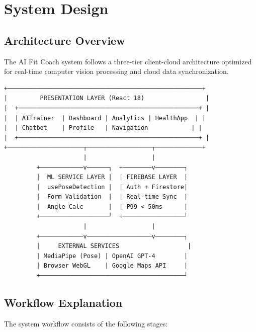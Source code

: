 \documentclass[12pt,a4paper]{article}
\begin{document}
\section{System Design}

\subsection{Architecture Overview}

The AI Fit Coach system follows a three-tier client-cloud architecture optimized for 
real-time computer vision processing and cloud data synchronization.

\begin{verbatim}
+──────────────────────────────────────────────────────+
|         PRESENTATION LAYER (React 18)                 |
|  +──────────────────────────────────────────────────+ |
|  | AITrainer  | Dashboard | Analytics | HealthApp  | |
|  | Chatbot    | Profile   | Navigation            | |
|  +──────────────────────────────────────────────────+ |
+─────────────────────┬──────────────────┬─────────────+
                      |                  |
         +────────────v──────┐  +────────v────────┐
         |  ML SERVICE LAYER |  | FIREBASE LAYER  |
         |  usePoseDetection |  | Auth + Firestore|
         |  Form Validation  |  | Real-time Sync  |
         |  Angle Calc       |  | P99 < 50ms      |
         +───────────────────┘  +─────────────────┘
                      |                  |
         +────────────v──────────────────v────────┐
         |     EXTERNAL SERVICES                   |
         | MediaPipe (Pose) | OpenAI GPT-4        |
         | Browser WebGL    | Google Maps API     |
         +────────────────────────────────────────┘
\end{verbatim}

\subsection{Workflow Explanation}

The system workflow consists of the following stages:
\end{document}
